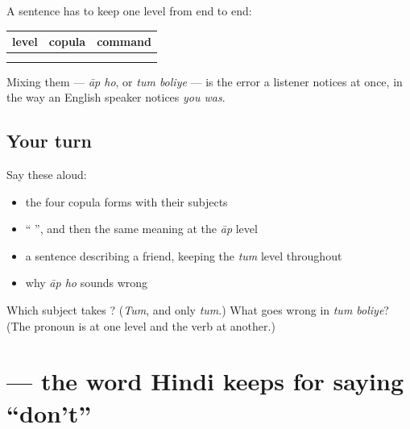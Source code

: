 \begin{grammarlens}[title={Grammar Lens: matching the level all the way through}]
A sentence has to keep one level from end to end:

\noindent
\begin{tabularx}{\linewidth}{@{}>{\raggedright\arraybackslash}X>{\raggedright\arraybackslash}X>{\raggedright\arraybackslash}X@{}}
\toprule
\textbf{level} & \textbf{copula} & \textbf{command} \\
\midrule
\hi{तुम} & \textbf{\hi{हो}} & \hi{बोलो} \\
\hi{आप} & \hi{हैं} & \hi{बोलिए} \\
\bottomrule
\end{tabularx}

Mixing them — \emph{āp ho}, or \emph{tum boliye} — is the error a listener notices at once, in the way an English speaker notices \emph{you was}.
\end{grammarlens}

\subsection*{Your turn}
Say these aloud:

\begin{itemize}
\raggedright
  \item the four copula forms with their subjects
  \item \textquotedblleft{} \textquotedblright{}, and then the same meaning at the \emph{āp} level
  \item a sentence describing a friend, keeping the \emph{tum} level throughout
  \item why \emph{āp ho} sounds wrong
\end{itemize}

\begin{tcolorbox}[breakable,colback=teal!4,colframe=teal!35!black,title={Before you move on}]
Which subject takes \textbf{}? (\emph{Tum}, and only \emph{tum}.) What goes wrong in \emph{tum boliye}? (The pronoun is at one level and the verb at another.)
\end{tcolorbox}
\section[\texorpdfstring{\hi{मत} (mat)}{मत (mat)}]{ — the word Hindi keeps for saying \textquotedblleft{}don't\textquotedblright{}}

\label{lesson:HI-C85-mat}



